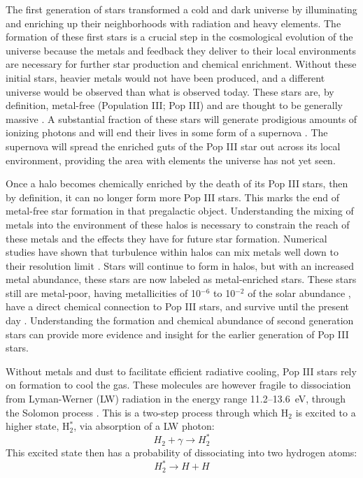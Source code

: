 \documentclass[a4paper,fleqn,usenatbib]{mnras}
\begin{document}
The first generation of stars transformed a cold and dark universe
by illuminating and enriching up their neighborhoods with radiation
and heavy elements. The formation of these first stars is a crucial step in the cosmological evolution of the universe because the metals and feedback they deliver to their local environments are necessary for further star production and chemical enrichment. Without these initial stars, heavier metals would not have been produced, and a different universe would be observed than what is observed today. These stars are, by definition, metal-free (Population III; Pop III) and are thought to be generally massive \citep{ABN02, Bromm02_P3, Turk09, Hosokawa11, Hosokawa16, Hirano15}. A substantial fraction of these stars will generate prodigious amounts of ionizing photons and will end their lives in some form of a supernova \citep[e.g.][]{Schaerer02, Heger02}. The supernova will spread the enriched guts of the Pop III star out across its local environment, providing the area with elements the universe has not yet seen. 

Once a halo becomes chemically enriched by the death of its Pop III stars, then by definition, it can no longer form more Pop III stars. This marks the end of metal-free star formation in that pregalactic object. Understanding the mixing of metals into the environment of these halos is necessary to constrain the reach of these metals and the effects they have for future star formation. Numerical studies have shown that turbulence within halos can mix metals well down to their resolution limit \citep{Wise08_Gal, Greif10, Smith15}. Stars will continue to form in halos, but with an increased metal abundance, these stars are now labeled as metal-enriched stars. These stars still are metal-poor, having metallicities of 10$^{-6}$ to 10$^{-2}$ of the solar abundance \citep{Chiaki16, Chiaki18, Ritter16}, have a direct chemical connection to Pop III stars, and survive until the present day \citep{Gnedin06, Tumlinson10, Griffen18, Magg18, Ezzeddine19}. Understanding the formation and chemical abundance of second generation stars can provide more evidence and insight for the earlier generation of Pop III stars.

Without metals and dust to facilitate efficient radiative cooling, Pop III stars rely on \hh{} formation to cool the gas. These molecules are however fragile to dissociation from Lyman-Werner (LW) radiation in the energy range 11.2--13.6~eV, through the Solomon process \citep{Field66, Stecher67}. This is a two-step process through which H$_{2}$ is excited to a higher state, H$_{2}^{\ast}$, via absorption of a LW photon:
\begin{equation} \label{Solomon1}
	H_{2} + \gamma \rightarrow  H_{2}^{\ast}
\end{equation}
This excited state then has a probability of dissociating into two hydrogen atoms:
\begin{equation} \label{Solomon2}
	H_{2}^{\ast} \rightarrow H + H
\end{equation}
\end{document}
